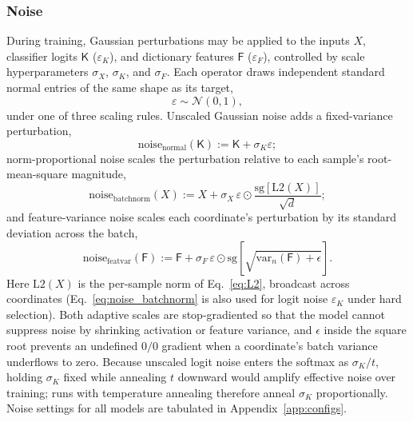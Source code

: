\subsubsection{Noise}
\label{sec:noise}
During training, Gaussian perturbations may be applied to the inputs $X$,
classifier logits $\mathsf{K}$ ($\varepsilon_K$), and dictionary features
$\mathsf{F}$ ($\varepsilon_F$), controlled by scale hyperparameters
$\sigma_X$, $\sigma_K$, and $\sigma_F$. Each operator draws independent
standard normal entries of the same shape as its target,
\begin{equation}
	\varepsilon \sim \mathcal{N}(0,1),
\end{equation}
under one of three scaling rules. Unscaled Gaussian noise adds a
fixed-variance perturbation,
\begin{equation}
	\mathrm{noise}_{\mathrm{normal}}(\mathsf{K}) :=
	\mathsf{K} + \sigma_K\varepsilon;
	\label{eq:noise_normal}
\end{equation}
norm-proportional noise scales the perturbation relative to each sample's
root-mean-square magnitude,
\begin{equation}
	\mathrm{noise}_{\mathrm{batchnorm}}(X) := X + \sigma_X\,\varepsilon
	\odot \frac{\mathrm{sg}\!\left[\mathrm{L2}(X)\right]}{\sqrt{d}};
	\label{eq:noise_batchnorm}
\end{equation}
and feature-variance noise scales each coordinate's perturbation by its
standard deviation across the batch,
\begin{equation}
	\mathrm{noise}_{\mathrm{featvar}}(\mathsf{F}) := \mathsf{F} +
	\sigma_F\,\varepsilon \odot \mathrm{sg}\!\left[
	\sqrt{\mathrm{var}_n(\mathsf{F}) + \epsilon}\right].
	\label{eq:noise_featvar}
\end{equation}
Here $\mathrm{L2}(X)$ is the per-sample norm of Eq.~\eqref{eq:L2},
broadcast across coordinates (Eq.~\eqref{eq:noise_batchnorm} is also used
for logit noise $\varepsilon_K$ under hard selection). Both adaptive
scales are stop-gradiented so that the model cannot suppress noise by
shrinking activation or feature variance, and $\epsilon$ inside the
square root prevents an undefined $0/0$ gradient when a coordinate's
batch variance underflows to zero. Because unscaled logit noise enters
the softmax as $\sigma_K/t$, holding $\sigma_K$ fixed while annealing $t$
downward would amplify effective noise over training; runs with
temperature annealing therefore anneal $\sigma_K$ proportionally. Noise
settings for all models are tabulated in Appendix~\ref{app:configs}.

